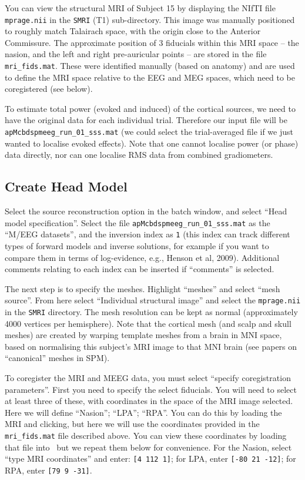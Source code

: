 You can view the structural MRI of Subject 15 by displaying the NIfTI file \texttt{mprage.nii} in the \texttt{SMRI} (T1) sub-directory. This image was manually positioned to roughly match Talairach space, with the origin close to the Anterior Commissure. The approximate position of 3 fiducials within this MRI space -- the nasion, and the left and right pre-auricular points -- are stored in the file \texttt{mri\_fids.mat}. These were identified manually (based on anatomy) and are used to define the MRI space relative to the EEG and MEG spaces, which need to be coregistered (see below).

To estimate total power (evoked and induced) of the cortical sources, we need to have the original data for each individual trial. Therefore our input file will be \texttt{apMcbdspmeeg\_run\_01\_sss.mat} (we could select the trial-averaged file if we just wanted to localise evoked effects). Note that one cannot localise power (or phase) data directly, nor can one localise RMS data from combined gradiometers.

\subsection{Create Head Model}

Select the source reconstruction option in the batch window, and select ``Head model specification''. Select the file \texttt{apMcbdspmeeg\_run\_01\_sss.mat} as the ``M/EEG datasets'', and the inversion index as \texttt{1} (this index can track different types of forward models and inverse solutions, for example if you want to compare them in terms of log-evidence, e.g., Henson et al, 2009). Additional comments relating to each index can be inserted if ``comments'' is selected. 

The next step is to specify the meshes. Highlight ``meshes'' and select ``mesh source''. From here select ``Individual structural image'' and select the \texttt{mprage.nii} in the \texttt{SMRI} directory. The mesh resolution can be kept as normal (approximately 4000 vertices per hemisphere). Note that the cortical mesh (and scalp and skull meshes) are created by warping template meshes from a brain in MNI space, based on normalising this subject's MRI image to that MNI brain (see papers on ``canonical'' meshes in SPM).

To coregister the MRI and MEEG data, you must select ``specify coregistration parameters''. First you need to specify the select fiducials. You will need to select at least three of these, with coordinates in the space of the MRI image selected. Here we will define ``Nasion''; ``LPA''; ``RPA''. You can do this by loading the MRI and clicking, but here we will use the coordinates provided in the \texttt{mri\_fids.mat} file described above. You can view these coordinates by loading that file into \matlab\, but we repeat them below for convenience. For the Nasion, select ``type MRI coordinates'' and enter: \texttt{[4 112 1]}; for LPA, enter \texttt{[-80 21 -12]}; for RPA, enter \texttt{[79 9 -31]}.

